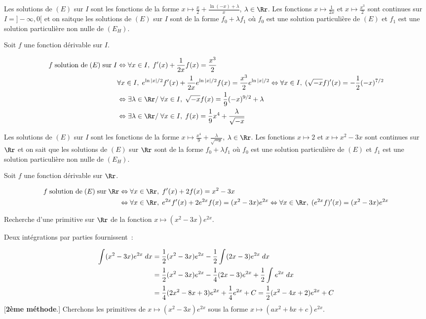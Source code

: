 {{Les solutions de $(E)$ sur  $I$ sont les fonctions de la forme $x\mapsto\frac{x}{2}+\frac{\ln(-x)+\lambda}{x}$,
$\lambda\in\Rr$.
Les fonctions $x\mapsto\frac{1}{2x}$ et $x\mapsto\frac{x^3}{2}$ sont continues sur $I=]-\infty,0[$ et on
saitque les solutions de $(E)$ sur $I$ sont de la forme
$f_0+\lambda f_1$ où $f_0$ est une solution particulière de $(E)$ et $f_1$ est une solution particulière non nulle de
$(E_H)$.

Soit $f$ une fonction dérivable sur $I$.

\begin{align*}\ensuremath
f\;\mbox{solution de}\;(E)\;\mbox{sur}\;I&\Leftrightarrow\forall x\in I,\;f'(x)+\frac{1}{2x}f(x)=\frac{x^3}{2}\\
 &\forall x\in I,\;e^{\ln|x|/2}f'(x)+\frac{1}{2x}e^{\ln|x|/2}f(x)=\frac{x^3}{2}e^{\ln|x|/2}\Leftrightarrow\forall x\in
I,\;(\sqrt{-x}f)'(x)=-\frac{1}{2}(-x)^{7/2}\\
 &\Leftrightarrow\exists\lambda\in\Rr/\;\forall x\in I,\;\sqrt{-x}f(x)=\frac{1}{9}(-x)^{9/2}+\lambda\\
 &\Leftrightarrow\exists\lambda\in\Rr/\;\forall x\in I,\;f(x)=\frac{1}{9}x^4+\frac{\lambda}{\sqrt{-x}}
\end{align*}

Les solutions de $(E)$ sur  $I$ sont les fonctions de la forme $x\mapsto\frac{x^4}{9}+\frac{\lambda}{\sqrt{-x}}$,
$\lambda\in\Rr$.
Les fonctions $x\mapsto2$ et $x\mapsto x^2-3x$ sont continues sur $\Rr$ et on sait
que les solutions de $(E)$ sur $\Rr$ sont de la forme
$f_0+\lambda f_1$ où $f_0$ est une solution particulière de $(E)$ et $f_1$ est une solution particulière non nulle de
$(E_H)$.

Soit $f$ une fonction dérivable sur $\Rr$.

\begin{align*}\ensuremath
f\;\mbox{solution de}\;(E)\;\mbox{sur}\;\Rr&\Leftrightarrow\forall x\in\Rr,\;f'(x)+2f(x)=x^2-3x\\
 &\Leftrightarrow\forall x\in\Rr,\;e^{2x}f'(x)+2e^{2x}f(x)=(x^2-3x)e^{2x}\Leftrightarrow\forall
x\in\Rr,\;(e^{2x}f)'(x)=(x^2-3x)e^{2x}
\end{align*}

Recherche d'une primitive sur ${\Rr}$ de la fonction $x\mapsto(x^2-3x)e^{2x}$.
\begin{itemize}
 Deux intégrations par parties fournissent~:

\begin{align*}\ensuremath
\int_{}^{}(x^2-3x)e^{2x}\;dx&=\frac{1}{2}(x^2-3x)e^{2x}-\frac{1}{2}\int_{}^{}(2x-3)e^{2x}\;dx\\
 &=\frac{1}{2}(x^2-3x)e^{2x}-\frac{1}{4}(2x-3)e^{2x}+\frac{1}{2}\int_{}^{}e^{2x}\;dx\\
 &=\frac{1}{4}(2x^2-8x+3)e^{2x}+\frac{1}{4}e^{2x}+C=\frac{1}{2}(x^2-4x+2)e^{2x}+C
\end{align*}
[\textbf{2ème méthode}.] Cherchons les primitives de $x\mapsto(x^2-3x)e^{2x}$ sous la forme
$x\mapsto(ax^2+bx+c)e^{2x}$.


\end{itemize}}}
